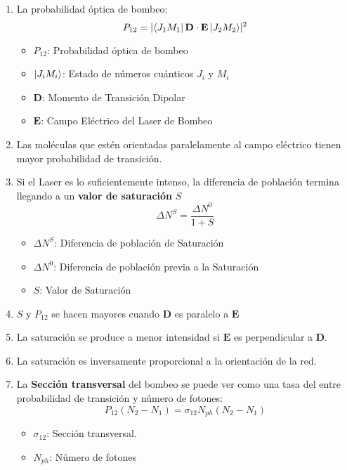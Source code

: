\documentclass[aps,rmp,reprint,longbibliography]{revtex4-1}
\begin{document}
\begin{enumerate}
\item La probabilidad óptica de bombeo:
\begin{equation}\label{eq6}P_{12}=\lvert\bra{J_1M_1}\textbf{D}\cdot\textbf{E}\ket{J_2M_2}\rvert^2\end{equation}
\begin{itemize}
    \item $P_{12}$: Probabilidad óptica de bombeo
    \item $\ket{J_iM_i}$: Estado de números cuánticos $J_i$ y $M_i$
    \item $\textbf{D}$: Momento de Transición Dipolar
    \item $\textbf{E}$: Campo Eléctrico del Laser de Bombeo
\end{itemize}
\item Las moléculas que estén orientadas paralelamente al campo eléctrico tienen mayor probabilidad de transición. 
\item Si el Laser es lo suficientemente intenso, la diferencia de población termina llegando a un \textbf{valor de saturación} $S$
\begin{equation}\label{eq7}\Delta N^S=\frac{\Delta N^0}{1+S}\end{equation} 
\begin{itemize}
    \item $\Delta N^S$: Diferencia de población de Saturación 
    \item $\Delta N^0$: Diferencia de población previa a la Saturación
    \item $S$: Valor de Saturación 
\end{itemize}
\item $S$ y $P_{12}$ se hacen mayores cuando $\textbf{D}$ es paralelo a $\textbf{E}$
\item La saturación se produce a menor intensidad si $\textbf{E}$ es perpendicular a $\textbf{D}$. 
\item La saturación es inversamente proporcional a la orientación de la red.
\item La \textbf{Sección transversal} del bombeo se puede ver como una tasa del entre probabilidad de transición y número de fotones: 
\begin{equation}\label{eq8}P_{12}(N_2-N_1)=\sigma_{12}N_{ph}(N_2-N_1)\end{equation}
\begin{itemize}
    \item $\sigma_{12}$: Sección transversal.
    \item $N_{ph}$: Número de fotones 
\end{itemize}

\end{enumerate}
\end{document}
